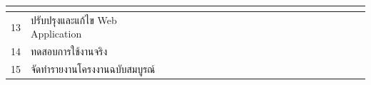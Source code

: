 \documentclass[12pt,oneside,openright,a4paper]{cpe-thai-project}
\begin{document}
\begin{table}[!h]
{\begin{tabular}{|llllllllllllllllllllll|}
      \multicolumn{1}{l|}{\cellcolor[HTML]{FFCE93}} &
      \multicolumn{1}{l|}{\cellcolor[HTML]{FFCE93}} &
      \multicolumn{1}{l|}{\cellcolor[HTML]{FFCE93}} &
      \multicolumn{1}{l|}{\cellcolor[HTML]{FFCE93}} &
      \multicolumn{1}{l|}{\cellcolor[HTML]{FFCE93}} &
      \multicolumn{1}{l|}{\cellcolor[HTML]{FFCE93}} &
      \multicolumn{1}{l|}{\cellcolor[HTML]{FFCE93}} &
      \multicolumn{1}{l|}{\cellcolor[HTML]{FFCE93}} &
      \multicolumn{1}{l|}{\cellcolor[HTML]{FFCE93}} &
      \multicolumn{1}{l|}{} &
      \multicolumn{1}{l|}{} &
      \multicolumn{1}{l|}{} &
      \multicolumn{1}{l|}{} &
      \multicolumn{1}{l|}{} &
      \multicolumn{1}{l|}{} &
      \multicolumn{1}{l|}{} &
       \\ \hline
    \multicolumn{1}{|l|}{13} &
      \multicolumn{1}{l|}{ปรับปรุงและแก้ไข   Web Application} &
      \multicolumn{1}{l|}{\cellcolor[HTML]{FFCE93}} &
      \multicolumn{1}{l|}{\cellcolor[HTML]{FFCE93}} &
      \multicolumn{1}{l|}{\cellcolor[HTML]{FFCE93}} &
      \multicolumn{1}{l|}{\cellcolor[HTML]{FFCE93}} &
      \multicolumn{1}{l|}{\cellcolor[HTML]{FFCE93}} &
      \multicolumn{1}{l|}{\cellcolor[HTML]{FFCE93}} &
      \multicolumn{1}{l|}{\cellcolor[HTML]{FFCE93}} &
      \multicolumn{1}{l|}{\cellcolor[HTML]{FFCE93}} &
      \multicolumn{1}{l|}{\cellcolor[HTML]{FFCE93}} &
      \multicolumn{1}{l|}{\cellcolor[HTML]{FFCE93}} &
      \multicolumn{1}{l|}{\cellcolor[HTML]{FFCE93}} &
      \multicolumn{1}{l|}{\cellcolor[HTML]{FFCE93}} &
      \multicolumn{1}{l|}{} &
      \multicolumn{1}{l|}{} &
      \multicolumn{1}{l|}{} &
      \multicolumn{1}{l|}{} &
      \multicolumn{1}{l|}{} &
      \multicolumn{1}{l|}{} &
      \multicolumn{1}{l|}{} &
       \\ \hline
    \multicolumn{1}{|l|}{14} &
      \multicolumn{1}{l|}{ทดสอบการใช้งานจริง} &
      \multicolumn{1}{l|}{} &
      \multicolumn{1}{l|}{} &
      \multicolumn{1}{l|}{} &
      \multicolumn{1}{l|}{} &
      \multicolumn{1}{l|}{} &
      \multicolumn{1}{l|}{} &
      \multicolumn{1}{l|}{} &
      \multicolumn{1}{l|}{} &
      \multicolumn{1}{l|}{} &
      \multicolumn{1}{l|}{} &
      \multicolumn{1}{l|}{} &
      \multicolumn{1}{l|}{} &
      \multicolumn{1}{l|}{\cellcolor[HTML]{FFCE93}} &
      \multicolumn{1}{l|}{\cellcolor[HTML]{FFCE93}} &
      \multicolumn{1}{l|}{} &
      \multicolumn{1}{l|}{} &
      \multicolumn{1}{l|}{} &
      \multicolumn{1}{l|}{} &
      \multicolumn{1}{l|}{} &
       \\ \hline
    \multicolumn{1}{|l|}{15} &
      \multicolumn{1}{l|}{จัดทำรายงานโครงงานฉบับสมบูรณ์} &

\end{tabular}}
\end{table}
\end{document}
